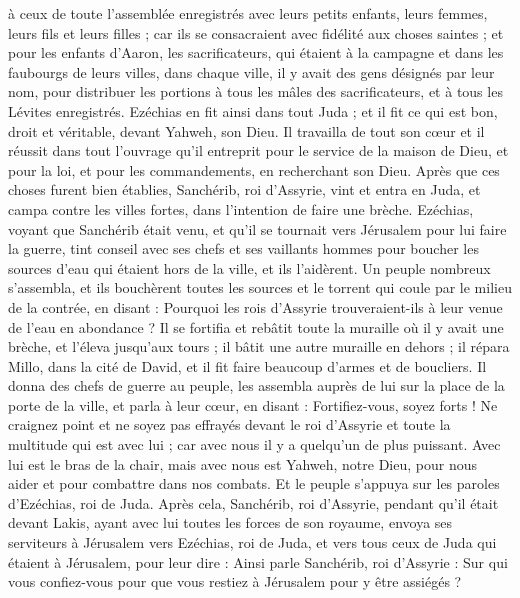 \begin{multicols}{2}
à ceux de toute l'assemblée enregistrés avec leurs petits enfants, leurs femmes, leurs fils et leurs filles ; car ils se consacraient avec fidélité aux choses saintes ;
et pour les enfants d'Aaron, les sacrificateurs, qui étaient à la campagne et dans les faubourgs de leurs villes, dans chaque ville, il y avait des gens désignés par leur nom, pour distribuer les portions à tous les mâles des sacrificateurs, et à tous les Lévites enregistrés.
Ezéchias en fit ainsi dans tout Juda ; et il fit ce qui est bon, droit et véritable, devant Yahweh, son Dieu.
Il travailla de tout son cœur et il réussit dans tout l'ouvrage qu'il entreprit pour le service de la maison de Dieu, et pour la loi, et pour les commandements, en recherchant son Dieu.
\VerseOne{}Après que ces choses furent bien établies, Sanchérib, roi d'Assyrie, vint et entra en Juda, et campa contre les villes fortes, dans l'intention de faire une brèche.
Ezéchias, voyant que Sanchérib était venu, et qu'il se tournait vers Jérusalem pour lui faire la guerre,
tint conseil avec ses chefs et ses vaillants hommes pour boucher les sources d'eau qui étaient hors de la ville, et ils l'aidèrent.
Un peuple nombreux s'assembla, et ils bouchèrent toutes les sources et le torrent qui coule par le milieu de la contrée, en disant : Pourquoi les rois d'Assyrie trouveraient-ils à leur venue de l'eau en abondance ?
Il se fortifia et rebâtit toute la muraille où il y avait une brèche, et l'éleva jusqu'aux tours ; il bâtit une autre muraille en dehors ; il répara Millo, dans la cité de David, et il fit faire beaucoup d'armes et de boucliers.
Il donna des chefs de guerre au peuple, les assembla auprès de lui sur la place de la porte de la ville, et parla à leur cœur, en disant :
Fortifiez-vous, soyez forts ! Ne craignez point et ne soyez pas effrayés devant le roi d'Assyrie et toute la multitude qui est avec lui ; car avec nous il y a quelqu'un de plus puissant.
Avec lui est le bras de la chair, mais avec nous est Yahweh, notre Dieu, pour nous aider et pour combattre dans nos combats. Et le peuple s'appuya sur les paroles d'Ezéchias, roi de Juda.
Après cela, Sanchérib, roi d'Assyrie, pendant qu'il était devant Lakis, ayant avec lui toutes les forces de son royaume, envoya ses serviteurs à Jérusalem vers Ezéchias, roi de Juda, et vers tous ceux de Juda qui étaient à Jérusalem, pour leur dire :
Ainsi parle Sanchérib, roi d'Assyrie : Sur qui vous confiez-vous pour que vous restiez à Jérusalem pour y être assiégés ?

\end{multicols}
